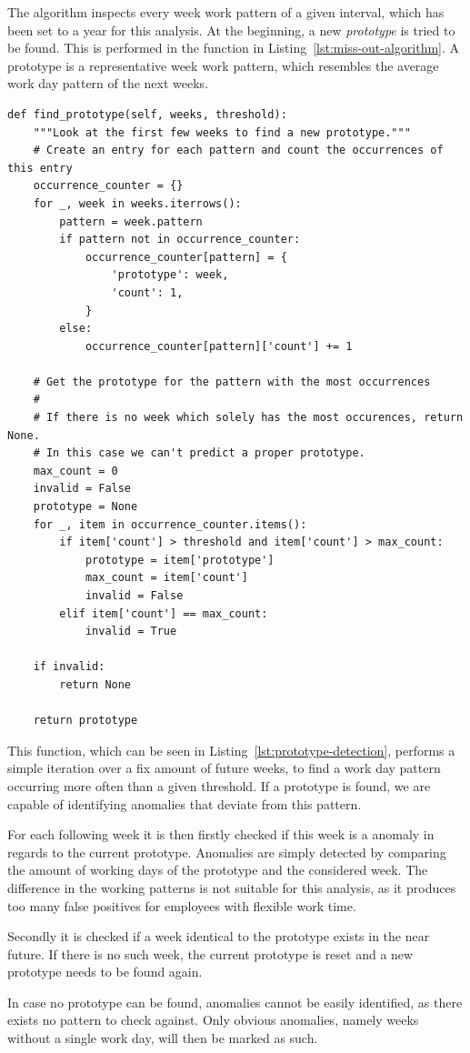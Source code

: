 The algorithm inspects every week work pattern of a given interval, which has been set to a year for this analysis.
At the beginning, a new \emph{prototype} is tried to be found.
This is performed in the function  in Listing~\ref{lst:miss-out-algorithm}.
A prototype is a representative week work pattern, which resembles the average work day pattern of the next weeks.


\begin{verbatim}
def find_prototype(self, weeks, threshold):
    """Look at the first few weeks to find a new prototype."""
    # Create an entry for each pattern and count the occurrences of this entry
    occurrence_counter = {}
    for _, week in weeks.iterrows():
        pattern = week.pattern
        if pattern not in occurrence_counter:
            occurrence_counter[pattern] = {
                'prototype': week,
                'count': 1,
            }
        else:
            occurrence_counter[pattern]['count'] += 1

    # Get the prototype for the pattern with the most occurrences
    #
    # If there is no week which solely has the most occurences, return None.
    # In this case we can't predict a proper prototype.
    max_count = 0
    invalid = False
    prototype = None
    for _, item in occurrence_counter.items():
        if item['count'] > threshold and item['count'] > max_count:
            prototype = item['prototype']
            max_count = item['count']
            invalid = False
        elif item['count'] == max_count:
            invalid = True

    if invalid:
        return None

    return prototype
\end{verbatim}
\begingroup
{}\label{lst:prototype-detection}
\endgroup

This function, which can be seen in Listing~\ref{lst:prototype-detection}, performs a simple iteration over a fix amount of future weeks, to find a work day pattern occurring more often than a given threshold.
If a prototype is found, we are capable of identifying anomalies that deviate from this pattern.

For each following week it is then firstly checked if this week is a anomaly in regards to the current prototype.
Anomalies are simply detected by comparing the amount of working days of the prototype and the considered week.
The difference in the working patterns is not suitable for this analysis, as it produces too many false positives for employees with flexible work time.

Secondly it is checked if a week identical to the prototype exists in the near future.
If there is no such week, the current prototype is reset and a new prototype needs to be found again.

In case no prototype can be found, anomalies cannot be easily identified, as there exists no pattern to check against.
Only obvious anomalies, namely weeks without a single work day, will then be marked as such.
